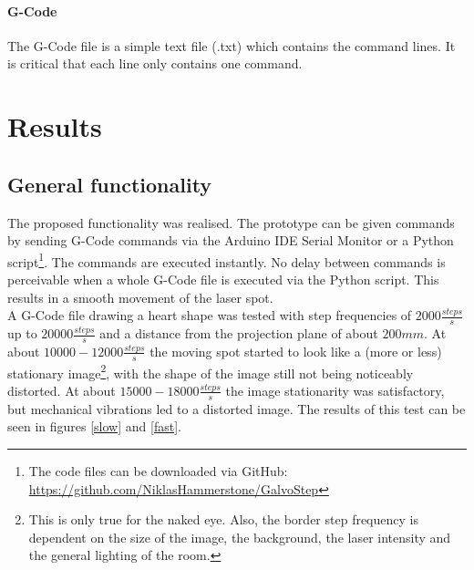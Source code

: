 \documentclass[a4paper, 11pt]{scrartcl}
\begin{document}
\paragraph{G-Code}
The G-Code file is a simple text file (.txt) which contains the command lines. It is critical that each line only contains one command. \\


\section{Results}
\subsection{General functionality}
The proposed functionality was realised. The prototype can be given commands by sending G-Code commands via the Arduino IDE Serial Monitor or a Python script\footnote{The code files can be downloaded via GitHub: \url{https://github.com/NiklasHammerstone/GalvoStep}}. The commands are executed instantly. No delay between commands is perceivable when a whole G-Code file is executed via the Python script. This results in a smooth movement of the laser spot. \\
A G-Code file drawing a heart shape was tested with step frequencies of $2000 \frac{steps}{s}$ up to $20000\frac{steps}{s}$ and a distance from the projection plane of about $200mm$. At about $10000-12000 \frac{steps}{s}$ the moving spot started to look like a (more or less) stationary image\footnote{This is only true for the naked eye. Also, the border step frequency is dependent on the size of the image, the background, the laser intensity and the general lighting of the room.}, with the shape of the image still not being noticeably distorted. At about $15000-18000 \frac{steps}{s}$ the image stationarity was satisfactory, but mechanical vibrations led to a distorted image. The results of this test can be seen in figures \ref{slow} and \ref{fast}. 
\end{document}
